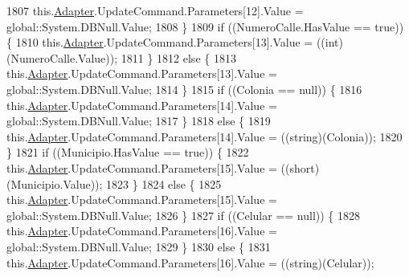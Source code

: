 \begin{DoxyCode}
1807                 this.\hyperlink{class_proyecto___integrador__3_1_1ds_usuarios_table_adapters_1_1_usuarios_table_adapter_a46252bad9dadbf20130beca25d50b5bc}{Adapter}.UpdateCommand.Parameters[12].Value = global::System.DBNull.Value;
1808             \}
1809             \textcolor{keywordflow}{if} ((NumeroCalle.HasValue == \textcolor{keyword}{true})) \{
1810                 this.\hyperlink{class_proyecto___integrador__3_1_1ds_usuarios_table_adapters_1_1_usuarios_table_adapter_a46252bad9dadbf20130beca25d50b5bc}{Adapter}.UpdateCommand.Parameters[13].Value = ((int)(NumeroCalle.Value));
1811             \}
1812             \textcolor{keywordflow}{else} \{
1813                 this.\hyperlink{class_proyecto___integrador__3_1_1ds_usuarios_table_adapters_1_1_usuarios_table_adapter_a46252bad9dadbf20130beca25d50b5bc}{Adapter}.UpdateCommand.Parameters[13].Value = global::System.DBNull.Value;
1814             \}
1815             \textcolor{keywordflow}{if} ((Colonia == null)) \{
1816                 this.\hyperlink{class_proyecto___integrador__3_1_1ds_usuarios_table_adapters_1_1_usuarios_table_adapter_a46252bad9dadbf20130beca25d50b5bc}{Adapter}.UpdateCommand.Parameters[14].Value = global::System.DBNull.Value;
1817             \}
1818             \textcolor{keywordflow}{else} \{
1819                 this.\hyperlink{class_proyecto___integrador__3_1_1ds_usuarios_table_adapters_1_1_usuarios_table_adapter_a46252bad9dadbf20130beca25d50b5bc}{Adapter}.UpdateCommand.Parameters[14].Value = ((string)(Colonia));
1820             \}
1821             \textcolor{keywordflow}{if} ((Municipio.HasValue == \textcolor{keyword}{true})) \{
1822                 this.\hyperlink{class_proyecto___integrador__3_1_1ds_usuarios_table_adapters_1_1_usuarios_table_adapter_a46252bad9dadbf20130beca25d50b5bc}{Adapter}.UpdateCommand.Parameters[15].Value = ((short)(Municipio.Value));
1823             \}
1824             \textcolor{keywordflow}{else} \{
1825                 this.\hyperlink{class_proyecto___integrador__3_1_1ds_usuarios_table_adapters_1_1_usuarios_table_adapter_a46252bad9dadbf20130beca25d50b5bc}{Adapter}.UpdateCommand.Parameters[15].Value = global::System.DBNull.Value;
1826             \}
1827             \textcolor{keywordflow}{if} ((Celular == null)) \{
1828                 this.\hyperlink{class_proyecto___integrador__3_1_1ds_usuarios_table_adapters_1_1_usuarios_table_adapter_a46252bad9dadbf20130beca25d50b5bc}{Adapter}.UpdateCommand.Parameters[16].Value = global::System.DBNull.Value;
1829             \}
1830             \textcolor{keywordflow}{else} \{
1831                 this.\hyperlink{class_proyecto___integrador__3_1_1ds_usuarios_table_adapters_1_1_usuarios_table_adapter_a46252bad9dadbf20130beca25d50b5bc}{Adapter}.UpdateCommand.Parameters[16].Value = ((string)(Celular));

\end{DoxyCode}

